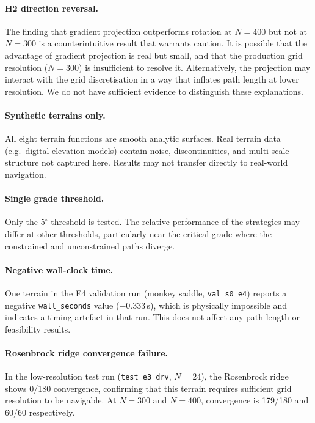 \documentclass[11pt,a4paper]{article}
\begin{document}
\paragraph{H2 direction reversal.}
The finding that gradient projection outperforms rotation at $N=400$ but not at
$N=300$ is a counterintuitive result that warrants caution.
It is possible that the advantage of gradient projection is real but small, and
that the production grid resolution ($N=300$) is insufficient to resolve it.
Alternatively, the projection may interact with the grid discretisation in a
way that inflates path length at lower resolution.
We do not have sufficient evidence to distinguish these explanations.

\paragraph{Synthetic terrains only.}
All eight terrain functions are smooth analytic surfaces.
Real terrain data (e.g.\ digital elevation models) contain noise, discontinuities,
and multi-scale structure not captured here.
Results may not transfer directly to real-world navigation.

\paragraph{Single grade threshold.}
Only the 5$^\circ$ threshold is tested.
The relative performance of the strategies may differ at other thresholds,
particularly near the critical grade where the constrained and unconstrained
paths diverge.

\paragraph{Negative wall-clock time.}
One terrain in the E4 validation run (monkey saddle, \texttt{val\_s0\_e4})
reports a negative \texttt{wall\_seconds} value ($-0.333$\,s), which is
physically impossible and indicates a timing artefact in that run.
This does not affect any path-length or feasibility results.

\paragraph{Rosenbrock ridge convergence failure.}
In the low-resolution test run (\texttt{test\_e3\_drv}, $N=24$), the Rosenbrock
ridge shows 0/180 convergence, confirming that this terrain requires sufficient
grid resolution to be navigable.
At $N=300$ and $N=400$, convergence is 179/180 and 60/60 respectively.
\end{document}
